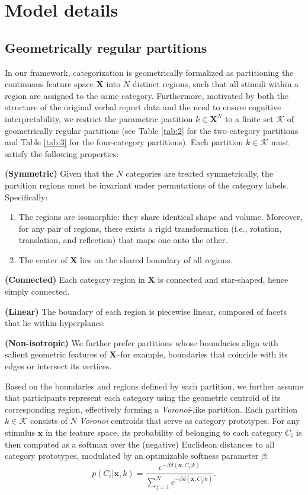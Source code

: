 \section{Model details}
\label{sec: model}

\subsection{Geometrically regular partitions}

In our framework, categorization is geometrically formalized as partitioning the continuous feature space $\mathbf{X}$ into $N$ distinct regions, such that all stimuli within a region are assigned to the same category. 
Furthermore, motivated by both the structure of the original verbal report data and the need to ensure cognitive interpretability, we restrict the parametric partition $k\in\mathbf{X}^N$ to a finite set $\mathcal{K}$ of geometrically regular partitions (see Table \ref{tab:2} for the two-category partitions and Table \ref{tab:3} for the four-category partitions). Each partition $k\in\mathcal{K}$ must satisfy the following properties:

\textbf{(Symmetric)} Given that the $N$ categories are treated symmetrically, the partition regions must be invariant under permutations of the category labels. Specifically:

\begin{enumerate}
    \item The regions are isomorphic: they share identical shape and volume. Moreover, for any pair of regions, there exists a rigid transformation (i.e., rotation, translation, and reflection) that maps one onto the other.
    \item The center of $\mathbf{X}$ lies on the shared boundary of all regions.
\end{enumerate}

\textbf{(Connected)} Each category region in $\mathbf{X}$ is connected and star-shaped, hence simply connected.

\textbf{(Linear)} The boundary of each region is piecewise linear, composed of facets that lie within hyperplanes.

\textbf{(Non-isotropic)} We further prefer partitions whose boundaries align with salient geometric features of $\mathbf{X}$--for example, boundaries that coincide with its edges or intersect its vertices.

Based on the boundaries and regions defined by each partition, we further assume that participants represent each category using the geometric centroid of its corresponding region, effectively forming a \textit{Voronoi}-like partition. Each partition $k \in \mathcal{K}$ consists of $N$ \textit{Voronoi} centroids that serve as category prototypes. For any stimulus $\mathbf{x}$ in the feature space, its probability of belonging to each category $C_i$ is then computed as a softmax over the (negative) Euclidean distances to all category prototypes, modulated by an optimizable softness parameter $\beta$:
\begin{equation}
p(C_i | \mathbf{x},k) = \frac{e^{-\beta d(\mathbf{x},C_i|k)}}{\sum_{j=1}^{N} e^{-\beta d(\mathbf{x},C_j|k)}}. \tag{1}
\end{equation}

